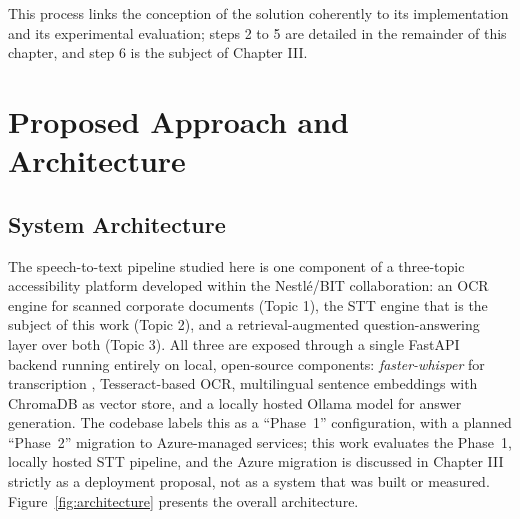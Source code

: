 \documentclass[12pt]{report}
\begin{document}
This process links the conception of the solution coherently to its implementation and its experimental evaluation; steps 2 to 5 are detailed in the remainder of this chapter, and step 6 is the subject of Chapter III.

\section{Proposed Approach and Architecture}

\subsection{System Architecture}

The speech-to-text pipeline studied here is one component of a three-topic accessibility platform developed within the Nestl\'e/BIT collaboration: an OCR engine for scanned corporate documents (Topic 1), the STT engine that is the subject of this work (Topic 2), and a retrieval-augmented question-answering layer over both (Topic 3). All three are exposed through a single FastAPI backend running entirely on local, open-source components: \textit{faster-whisper} for transcription \cite{fasterwhisper2023}, Tesseract-based OCR, multilingual sentence embeddings with ChromaDB as vector store, and a locally hosted Ollama model for answer generation. The codebase labels this as a \enquote{Phase~1} configuration, with a planned \enquote{Phase~2} migration to Azure-managed services; this work evaluates the Phase~1, locally hosted STT pipeline, and the Azure migration is discussed in Chapter III strictly as a deployment proposal, not as a system that was built or measured. Figure~\ref{fig:architecture} presents the overall architecture.
\end{document}
